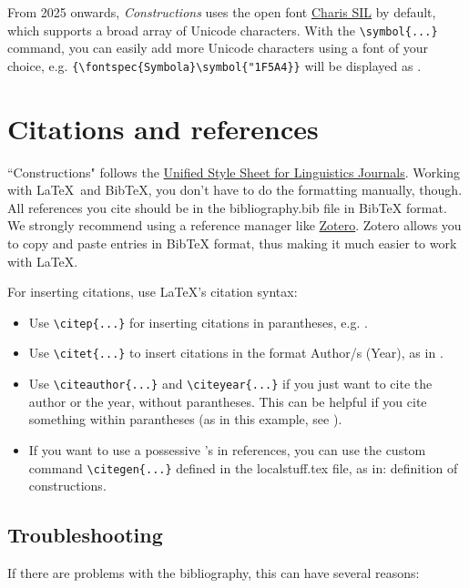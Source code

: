 \documentclass[]{constructions}
\begin{document}
From 2025 onwards, \textit{Constructions} uses the open font \href{https://software.sil.org/charis/}{Charis SIL} by default, which supports a broad array of Unicode characters. With the \verb!\symbol{...}! command, you can easily add more Unicode characters using a font of your choice, e.g. \verb!{\fontspec{Symbola}\symbol{"1F5A4}}! will be displayed as {}. 

\section{Citations and references}

``Constructions" follows the \href{https://www.linguisticsociety.org/resource/unified-style-sheet}{Unified Style Sheet for Linguistics Journals}. Working with \LaTeX \  and BibTeX, you don't have to do the formatting manually, though. All references you cite should be in the bibliography.bib file in BibTeX format. We strongly recommend using a reference manager like \href{https://www.zotero.org/}{Zotero}. Zotero allows you to copy and paste entries in BibTeX format, thus making it much easier to work with \LaTeX. 

For inserting citations, use \LaTeX's citation syntax:

\begin{itemize}
    \item Use \verb!\citep{...}! for inserting citations in parantheses, e.g. \citep{Example2}.
    \item Use \verb!\citet{...}! to insert citations in the format Author/s (Year), as in \citet{Example2}.
    \item Use \verb!\citeauthor{...}! and \verb!\citeyear{...}! if you just want to cite the author or the year, without parantheses. This can be helpful if you cite something within parantheses (as in this example, see \citeauthor{Example1} \citeyear{Example1}).
    \item If you want to use a possessive 's in references, you can use the custom command \verb!\citegen{...}! defined in the localstuff.tex file, as in:  definition of constructions.
\end{itemize}

\subsection*{Troubleshooting}

If there are problems with the bibliography, this can have several reasons:
\end{document}
